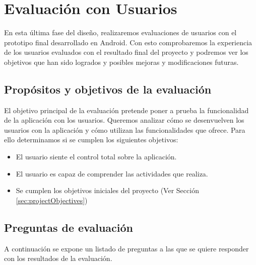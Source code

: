 \newpage
\thispagestyle{sectioned}
\chapter{Evaluación con Usuarios}

En esta última fase del diseño, realizaremos evaluaciones de usuarios con el prototipo final desarrollado en Android. Con esto comprobaremos la experiencia de los usuarios evaluados con el resultado final del proyecto y podremos ver los objetivos que han sido logrados y posibles mejoras y modificaciones futuras.

\section{Propósitos y objetivos de la evaluación}

El objetivo principal de la evaluación pretende poner a prueba la funcionalidad de la aplicación con los usuarios. Queremos analizar cómo se desenvuelven los usuarios con la aplicación y cómo utilizan las funcionalidades que ofrece. Para ello determinamos si se cumplen los siguientes objetivos:

\begin{itemize}
 \item El usuario siente el control total sobre la aplicación.
 \item El usuario es capaz de comprender las actividades que realiza.
 \item Se cumplen los objetivos iniciales del proyecto (Ver Sección \ref{sec:projectObjectives})
\end{itemize}

\section{Preguntas de evaluación}

A continuación se expone un listado de preguntas a las que se quiere responder con los resultados de la evaluación.

